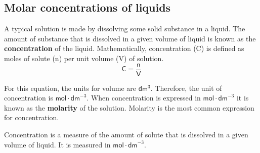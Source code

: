            \subsection*{Molar concentrations of liquids}
            \nopagebreak
      \label{m38712*id282848}A typical solution is made by dissolving some solid substance in a liquid. The amount of substance that is dissolved in a given volume of liquid is known as the \textbf{concentration} of the liquid. Mathematically, concentration (C) is defined as moles of solute (n) per unit volume (V) of solution.
      \label{m38712*id282860}\nopagebreak\noindent{}      
    \begin{equation*}
    \mathsf{C}=\frac{\mathsf{n}}{\mathsf{V}}
      \end{equation*}
	\begin{figure}[H] %
\begin{center}
\end{center}
 \end{figure}
      \label{m38712*id282881}For this equation, the units for volume are $\mathsf{dm}{}^{3}$. Therefore, the unit of concentration is $\mathsf{mol}\ensuremath{\cdot}{\mathsf{dm}}^{-3}$.
When concentration is expressed in $\mathsf{mol}\ensuremath{\cdot}{\mathsf{dm}}^{-3}$ it is known as the \textbf{molarity} of the solution. Molarity is the most common expression for concentration.
	\par
\label{m38712*fhsst!!!underscore!!!id1650}
 { \label{m38712*meaningfhsst!!!underscore!!!id1650}
      \label{m38712*id282955}Concentration is a measure of the amount of solute that is dissolved in a given volume of liquid. It is measured in $\mathsf{mol}\ensuremath{\cdot}{\mathsf{dm}}^{-3}$.} 
\par
            \label{m38712*secfhsst!!!underscore!!!id1653}\vspace{-2cm} 
      \noindent
